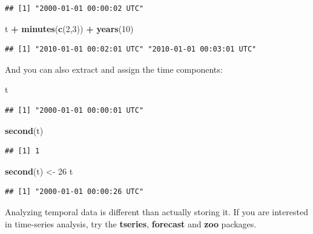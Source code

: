 \documentclass[]{book}
\newenvironment{Shaded}{\begin{snugshade}}{\end{snugshade}}
\newcommand{\DecValTok}[1]{\textcolor[rgb]{0.00,0.00,0.81}{#1}}
\newcommand{\KeywordTok}[1]{\textcolor[rgb]{0.13,0.29,0.53}{\textbf{#1}}}
\newcommand{\NormalTok}[1]{#1}
\newcommand{\OperatorTok}[1]{\textcolor[rgb]{0.81,0.36,0.00}{\textbf{#1}}}
\newcommand{\StringTok}[1]{\textcolor[rgb]{0.31,0.60,0.02}{#1}}
\theoremstyle{definition}
\theoremstyle{definition}
\theoremstyle{definition}
\theoremstyle{remark}
\begin{document}
\begin{verbatim}
## [1] "2000-01-01 00:00:02 UTC"
\end{verbatim}

\begin{Shaded}
\begin{Highlighting}[]
\NormalTok{t }\OperatorTok{+}\StringTok{ }\KeywordTok{minutes}\NormalTok{(}\KeywordTok{c}\NormalTok{(}\DecValTok{2}\NormalTok{,}\DecValTok{3}\NormalTok{)) }\OperatorTok{+}\StringTok{ }\KeywordTok{years}\NormalTok{(}\DecValTok{10}\NormalTok{)}
\end{Highlighting}
\end{Shaded}

\begin{verbatim}
## [1] "2010-01-01 00:02:01 UTC" "2010-01-01 00:03:01 UTC"
\end{verbatim}

And you can also extract and assign the time components:

\begin{Shaded}
\begin{Highlighting}[]
\NormalTok{t}
\end{Highlighting}
\end{Shaded}

\begin{verbatim}
## [1] "2000-01-01 00:00:01 UTC"
\end{verbatim}

\begin{Shaded}
\begin{Highlighting}[]
\KeywordTok{second}\NormalTok{(t)}
\end{Highlighting}
\end{Shaded}

\begin{verbatim}
## [1] 1
\end{verbatim}

\begin{Shaded}
\begin{Highlighting}[]
\KeywordTok{second}\NormalTok{(t) <-}\StringTok{ }\DecValTok{26}
\NormalTok{t}
\end{Highlighting}
\end{Shaded}

\begin{verbatim}
## [1] "2000-01-01 00:00:26 UTC"
\end{verbatim}

Analyzing temporal data is different than actually storing it.
If you are interested in time-series analysis, try the \textbf{tseries}, \textbf{forecast} and \textbf{zoo} packages.
\end{document}
